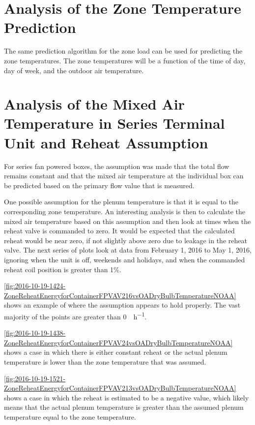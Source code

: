 \section{Analysis of the Zone Temperature Prediction} 

The same prediction algorithm for the zone load can be used for
predicting the zone temperatures. The zone temperatures will be a
function of the time of day, day of week, and the outdoor air
temperature. 


\section{Analysis of the Mixed Air Temperature in Series Terminal Unit and Reheat Assumption}

For series fan powered boxes, the assumption was made that the total
flow remains constant and that the mixed air temperature at the
individual box can be predicted based on the primary flow value that is
measured. 

One possible assumption for the plenum temperature is that it is equal
to the corresponding zone temperature. An interesting analysis is then
to calculate the mixed air temperature based on this assumption and then
look at times when the reheat valve is commanded to zero. It would be
expected that the calculated reheat would be near zero, if not slightly
above zero due to leakage in the reheat valve.
The next series of plots look at data from February 1, 2016 to May 1, 2016, ignoring when the unit is off, weekends and holidays, and when the commanded reheat coil position is greater than 1\%. 

\figref{}
\ref{fig:2016-10-19-1424-ZoneReheatEnergyforContainerFPVAV216vsOADryBulbTemperatureNOAA}
shows an example of where the assumption appears to hold properly.  The
vast majority of the points are greater than \SI{0}{\BTU\per\hour}.

\figref{}
\ref{fig:2016-10-19-1438-ZoneReheatEnergyforContainerFPVAV24vsOADryBulbTemperatureNOAA}
shows a case in which there is either constant reheat or the actual
plenum temperature is lower than the zone temperature that was assumed.

\figref{}
\ref{fig:2016-10-19-1521-ZoneReheatEnergyforContainerFPVAV213vsOADryBulbTemperatureNOAA}
shows a case in which the reheat is estimated to be a negative value,
which likely means that the actual plenum temperature is greater than
the assumed plenum temperature equal to the zone temperature. 

